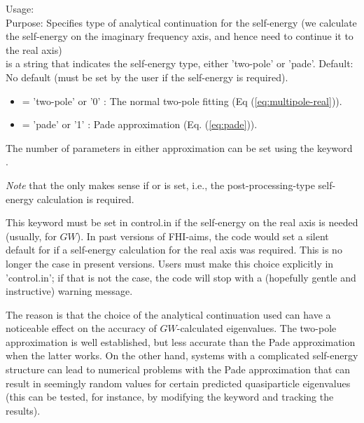 { \noindent
  Usage:   \\[1.0ex]
  Purpose: Specifies type of analytical continuation for the self-energy
   (we calculate the self-energy on the imaginary frequency axis, and
   hence need to continue it to the real axis) \\ 
   is a string that indicates the self-energy type,
  either 'two-pole' or 'pade'. Default: No default (must be set by the
  user if the self-energy is required).
}\\[1.0ex]
  \begin{itemize}
     \item {} = 'two-pole' or '0' : The normal two-pole
       fitting (Eq (\ref{eq:multipole-real})).
    \item {} = 'pade' or '1' : Pade approximation (Eq. (\ref{eq:pade})).
  \end{itemize}
The number of parameters in either approximation can be set using the
keyword .

\emph{Note} that the  only makes sense if 
 or  is set, i.e., the
post-processing-type self-energy calculation is required.

This keyword must be set in control.in if the self-energy on the real
axis is needed (usually, for $GW$).
In past versions of FHI-aims, the code would set a silent default for
 if a self-energy calculation for the real axis
was required. This is no longer the case in
present versions. Users must make this choice explicitly in
'control.in'; if that is not the case, the code will stop with a
(hopefully gentle and instructive) warning message.

The reason is that the choice of the analytical continuation used
can have a noticeable effect on the accuracy of $GW$-calculated
eigenvalues. The two-pole approximation is well established, but less
accurate than the Pade approximation when the latter works.\cite{GW100} On the
other hand, systems with a complicated self-energy structure can lead
to numerical problems with the Pade approximation that can result in
seemingly random values for certain predicted quasiparticle
eigenvalues (this can be tested, for instance, by modifying the
 keyword and tracking the results). 

